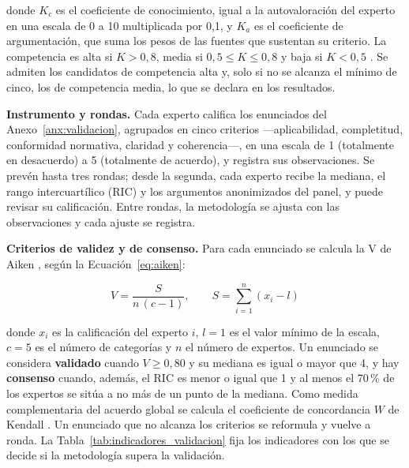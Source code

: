 \noindent donde $K_c$ es el coeficiente de conocimiento, igual a la autovaloración del experto en una escala de 0 a 10 multiplicada por 0,1, y $K_a$ es el coeficiente de argumentación, que suma los pesos de las fuentes que sustentan su criterio. La competencia es alta si $K > 0{,}8$, media si $0{,}5 \le K \le 0{,}8$ y baja si $K < 0{,}5$ \cite{cabero2013competencia}. Se admiten los candidatos de competencia alta y, solo si no se alcanza el mínimo de cinco, los de competencia media, lo que se declara en los resultados.

\textbf{Instrumento y rondas.} Cada experto califica los enunciados del Anexo~\ref{anx:validacion}, agrupados en cinco criterios ---aplicabilidad, completitud, conformidad normativa, claridad y coherencia---, en una escala de 1 (totalmente en desacuerdo) a 5 (totalmente de acuerdo), y registra sus observaciones. Se prevén hasta tres rondas; desde la segunda, cada experto recibe la mediana, el rango intercuartílico (RIC) y los argumentos anonimizados del panel, y puede revisar su calificación. Entre rondas, la metodología se ajusta con las observaciones y cada ajuste se registra.

\textbf{Criterios de validez y de consenso.} Para cada enunciado se calcula la V de Aiken \cite{aiken1985three}, según la Ecuación~\ref{eq:aiken}:

\begin{equation}
\label{eq:aiken}
V = \frac{S}{n\,(c-1)}, \qquad S = \sum_{i=1}^{n} (x_i - l)
\end{equation}

\noindent donde $x_i$ es la calificación del experto $i$, $l = 1$ es el valor mínimo de la escala, $c = 5$ es el número de categorías y $n$ el número de expertos. Un enunciado se considera \textbf{validado} cuando $V \geq 0{,}80$ y su mediana es igual o mayor que 4, y hay \textbf{consenso} cuando, además, el RIC es menor o igual que 1 y al menos el 70\,\% de los expertos se sitúa a no más de un punto de la mediana. Como medida complementaria del acuerdo global se calcula el coeficiente de concordancia $W$ de Kendall \cite{kendall1939rankings}. Un enunciado que no alcanza los criterios se reformula y vuelve a ronda. La Tabla~\ref{tab:indicadores_validacion} fija los indicadores con los que se decide si la metodología supera la validación.

